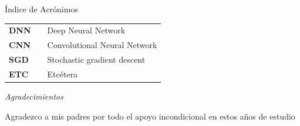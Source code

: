 \documentclass[12pt,spanish, singlespacing,]{MastersDoctoralThesis}
\newcommand\blankpage{%
    \null
    \thispagestyle{empty}%
    \addtocounter{page}{0}%
    \newpage}
\begin{document}
\afterpage{\blankpage}
\tableofcontents
\listoffigures
\newpage

\begin{center}
{\huge Índice de Acrónimos}\\[2cm]
\end{center}
\bigskip
\begin{tabular}{ l c l }
\textbf{DNN} & & Deep Neural Network\\
\textbf{CNN} & & Convolutional Neural Network\\
\textbf{SGD} & & Stochastic gradient descent\\

\textbf{ETC} & & Etcétera \\

\end{tabular}
\afterpage{\blankpage}

\newpage
\begin{center}
{\huge \textit{Agradecimientos}}\\[1.5cm]
\end{center}

Agradezco a mis padres por todo el apoyo incondicional en estos años de estudio



\afterpage{\blankpage}

\mainmatter 
\pagestyle{thesis}


$\ $

$\ $

$\ $





\afterpage{\blankpage}

\appendix

\end{document}
